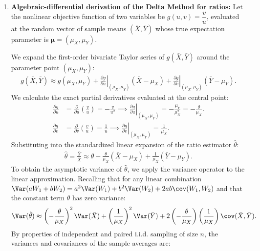 \begin{solucion}
	\begin{enumerate}
		\item \textbf{Algebraic-differential derivation of the Delta Method for ratios:}
		Let the nonlinear objective function of two variables be $g(u, v) = \dfrac{v}{u}$, evaluated at the random vector of sample means $(\bar{X}, \bar{Y})$ whose true expectation parameter is $\boldsymbol{\mu} = (\mu_X, \mu_Y)$.
		
		We expand the first-order bivariate Taylor series of $g(\bar{X}, \bar{Y})$ around the parameter point $(\mu_X, \mu_Y)$:
		\begin{align}
			g(\bar{X}, \bar{Y}) \approx g(\mu_X, \mu_Y) + \left. \frac{\partial g}{\partial u} \right|_{(\mu_X, \mu_Y)} (\bar{X} - \mu_X) + \left. \frac{\partial g}{\partial v} \right|_{(\mu_X, \mu_Y)} (\bar{Y} - \mu_Y).
		\end{align}
		We calculate the exact partial derivatives evaluated at the central point:
		\begin{align}
			\frac{\partial g}{\partial u} &= \frac{\partial}{\partial u}\left( \frac{v}{u} \right) = -\frac{v}{u^2} \implies \left. \frac{\partial g}{\partial u} \right|_{(\mu_X, \mu_Y)} = -\frac{\mu_Y}{\mu_X^2} = -\frac{\theta}{\mu_X}. \\
			\frac{\partial g}{\partial v} &= \frac{\partial}{\partial v}\left( \frac{v}{u} \right) = \frac{1}{u} \implies \left. \frac{\partial g}{\partial v} \right|_{(\mu_X, \mu_Y)} = \frac{1}{\mu_X}.
		\end{align}
		Substituting into the standardized linear expansion of the ratio estimator $\hat{\theta}$:
		\begin{align}
			\hat{\theta} = \frac{\bar{Y}}{\bar{X}} \approx \theta - \frac{\theta}{\mu_X}(\bar{X} - \mu_X) + \frac{1}{\mu_X}(\bar{Y} - \mu_Y).
		\end{align}
		To obtain the asymptotic variance of $\hat{\theta}$, we apply the variance operator to the linear approximation. Recalling that for any linear combination $\Var(aW_1 + bW_2) = a^2\Var(W_1) + b^2\Var(W_2) + 2ab\cov(W_1, W_2)$ and that the constant term $\theta$ has zero variance:
		\begin{align}
			\Var(\hat{\theta}) \approx \left( -\frac{\theta}{\mu_X} \right)^2 \Var(\bar{X}) + \left( \frac{1}{\mu_X} \right)^2 \Var(\bar{Y}) + 2\left( -\frac{\theta}{\mu_X} \right)\left( \frac{1}{\mu_X} \right) \cov(\bar{X}, \bar{Y}).
		\end{align}
		By properties of independent and paired i.i.d. sampling of size $n$, the variances and covariances of the sample averages are:

\end{enumerate}
\end{solucion}

